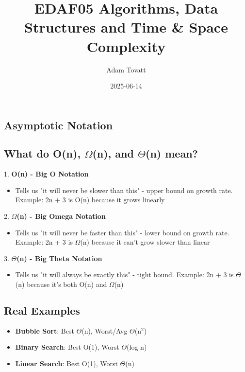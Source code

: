 \documentclass[11pt,a4paper]{article}
\title{EDAF05 Algorithms, Data Structures and Time \& Space Complexity}
\author{Adam Tovatt}
\date{2025-06-14}
\makeatletter
\renewcommand{\maketitle}{%
  \begin{flushleft}
    {\large\bfseries\@title}\hspace{1em}{\small\@author}\hspace{1em}{\small\@date}
  \end{flushleft}
  \vspace{0.5em}
}
\makeatother
\begin{document}
\maketitle

\begin{multicols}{2}
\section{Asymptotic Notation}
\subsection{What do O(n), $\Omega$(n), and $\Theta$(n) mean?}

1. \textbf{O(n) - Big O Notation}
\begin{itemize}
    \item Tells us "it will never be slower than this" - upper bound on growth rate. Example: 2n + 3 is O(n) because it grows linearly
\end{itemize}

2. \textbf{$\Omega$(n) - Big Omega Notation}
\begin{itemize}
    \item Tells us "it will never be faster than this" - lower bound on growth rate. Example: 2n + 3 is $\Omega$(n) because it can't grow slower than linear
\end{itemize}

3. \textbf{$\Theta$(n) - Big Theta Notation}
\begin{itemize}
    \item Tells us "it will always be exactly this" - tight bound. Example: 2n + 3 is $\Theta$(n) because it's both O(n) and $\Omega$(n)
\end{itemize}

\subsection{Real Examples}
\begin{itemize}
    \item \textbf{Bubble Sort}: Best $\Theta$(n), Worst/Avg $\Theta$(n$^2$)
    \item \textbf{Binary Search}: Best O(1), Worst $\Theta$(log n)
    \item \textbf{Linear Search}: Best O(1), Worst $\Theta$(n)
\end{itemize}


\end{multicols}
\end{document}
